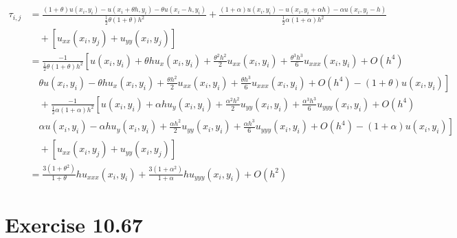 \documentclass[a4paper]{article}
\begin{document}
\begin{equation}
    \begin{aligned}
        \tau_{i,j} &= \frac{(1+\theta)u(x_i,y_i)-u(x_i+\theta h,y_i)-\theta u(x_i-h,y_i)}{\frac{1}{2}\theta (1+\theta)h^2}
        +\frac{(1+\alpha)u(x_i,y_i)-u(x_i,y_i+\alpha h)-\alpha u(x_i,y_i-h)}{\frac{1}{2}\alpha (1+\alpha)h^2} \\
        &\quad + \left[ u_{xx}(x_i,y_j) + u_{yy}(x_i,y_j) \right]\\
        &=\frac{-1}{\frac{1}{2}\theta (1+\theta)h^2}\left[
            u(x_i,y_i) + \theta h u_x(x_i,y_i) + \frac{\theta^2 h^2}{2}u_{xx}(x_i,y_i) + \frac{\theta^3 h^3}{6}u_{xxx}(x_i,y_i) +O(h^4)\right.\\
            &\quad \left.\theta u(x_i,y_i) - \theta h u_x(x_i,y_i) + \frac{\theta h^2}{2}u_{xx}(x_i,y_i) + \frac{\theta h^3}{6}u_{xxx}(x_i,y_i) +O(h^4) -(1+\theta)u(x_i,y_i) \right] \\
        &\quad +\frac{-1}{\frac{1}{2}\alpha (1+\alpha)h^2}\left[
            u(x_i,y_i) + \alpha h u_y(x_i,y_i) + \frac{\alpha^2 h^2}{2}u_{yy}(x_i,y_i) + \frac{\alpha^3 h^3}{6}u_{yyy}(x_i,y_i) + O(h^4)\right.\\
            &\quad \left.\alpha u(x_i,y_i) - \alpha h u_y(x_i,y_i) + \frac{\alpha h^2}{2}u_{yy}(x_i,y_i) + \frac{\alpha h^3}{6}u_{yyy}(x_i,y_i) + O(h^4) -(1+\alpha)u(x_i,y_i) \right]\\
            &\quad + \left[ u_{xx}(x_i,y_j) + u_{yy}(x_i,y_j) \right]\\
        &=\frac{3(1+\theta^2)}{1+\theta}h u_{xxx}(x_i,y_i)
        + \frac{3(1+\alpha^2)}{1+\alpha}hu_{yyy}(x_i,y_i)
        + O(h^2)
    \end{aligned}
\end{equation}

\section*{Exercise 10.67}
\end{document}
